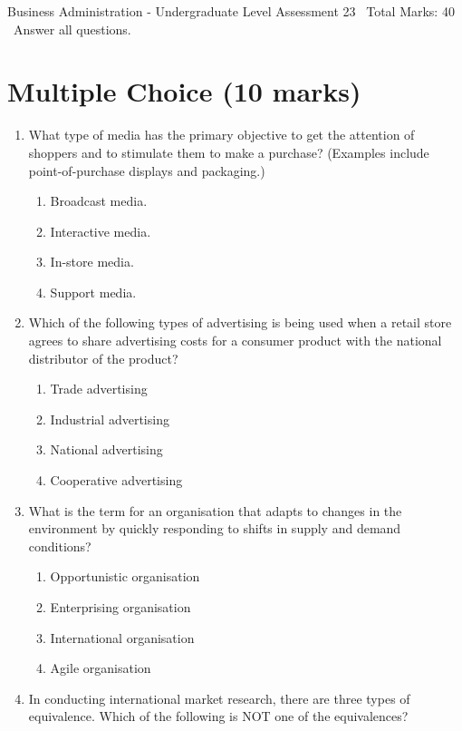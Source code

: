 \documentclass[12pt]{article}
\begin{document}
\begin{center}
Business Administration - Undergraduate Level Assessment 23 \
Total Marks: 40 \
Answer all questions.
\end{center}

\section*{Multiple Choice (10 marks)}
\begin{enumerate}[label=\arabic*.]
\item What type of media has the primary objective to get the attention of shoppers and to stimulate them to make a purchase? (Examples include point-of-purchase displays and packaging.)
\begin{enumerate}[label=(\alph*)]
    \item Broadcast media.
    \item Interactive media.
    \item In-store media.
    \item Support media.
\end{enumerate}
\item Which of the following types of advertising is being used when a retail store agrees to share advertising costs for a consumer product with the national distributor of the product?
\begin{enumerate}[label=(\alph*)]
    \item Trade advertising
    \item Industrial advertising
    \item National advertising
    \item Cooperative advertising
\end{enumerate}
\item What is the term for an organisation that adapts to changes in the environment by quickly responding to shifts in supply and demand conditions?
\begin{enumerate}[label=(\alph*)]
    \item Opportunistic organisation
    \item Enterprising organisation
    \item International organisation
    \item Agile organisation
\end{enumerate}
\item In conducting international market research, there are three types of equivalence. Which of the following is NOT one of the equivalences?
\begin{enumerate}[label=(\alph*)]

\end{enumerate}
\end{enumerate}
\end{document}
